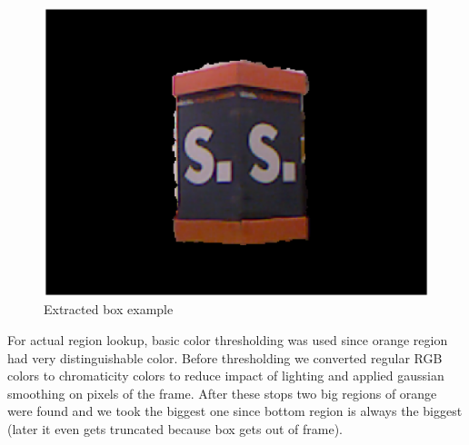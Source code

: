 \documentclass{article}
\begin{document}
\begin{figure}[h!]
  \centering
  \includegraphics[width=1.0\textwidth]{figs/extracted_box_example}
  \caption{Extracted box example}
  \label{fig:extracted_box_example}
\end{figure}


For actual region lookup, basic color thresholding was used
since orange region had very distinguishable color. Before 
thresholding we converted regular RGB colors
to chromaticity colors to reduce impact of lighting
and applied gaussian smoothing on pixels of
the frame. After these stops two big regions of
orange were found and we took the biggest one
since bottom region is always the biggest (later it 
even gets truncated because box gets out of frame).
\end{document}
